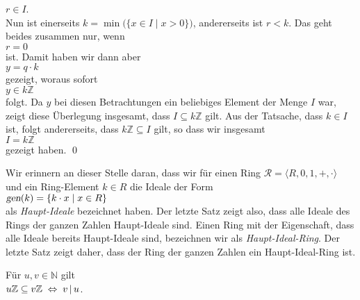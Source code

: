 \begin{enumerate}
      $r \in I$.
      \\[0.2cm]
      Nun ist einerseits $k = \min\bigl(\{x \in I \mid x > 0 \}\bigr)$, andererseits ist $r < k$.
      Das geht beides zusammen nur, wenn
      \\[0.2cm]
      \hspace*{1.3cm}
      $r = 0$
      \\[0.2cm]
      ist.  Damit haben wir dann aber
      \\[0.2cm]
      \hspace*{1.3cm}
      $y = q \cdot k$
      \\[0.2cm]
      gezeigt, woraus sofort
      \\[0.2cm]
      \hspace*{1.3cm}
      $y \in k\mathbb{Z}$
      \\[0.2cm]
      folgt.  Da $y$ bei diesen Betrachtungen ein beliebiges Element der Menge $I$ war,
      zeigt diese \"{U}berlegung insgesamt, dass $I \subseteq k\mathbb{Z}$ gilt.  Aus der
      Tatsache, dass $k \in I$ ist, folgt andererseits, dass $k\mathbb{Z} \subseteq I$
      gilt, so dass wir insgesamt
      \\[0.2cm]
      \hspace*{1.3cm}
      $I = k\mathbb{Z}$
      \\[0.2cm]
      gezeigt haben.  \qed
\end{enumerate}

\remark
Wir erinnern an dieser Stelle daran, dass wir f\"{u}r einen Ring 
$\mathcal{R} = \langle R, 0, 1, +, \cdot \rangle$ und ein
Ring-Element $k \in R$ die Ideale der Form
\\[0.2cm]
\hspace*{1.3cm}
$\textsl{gen}(k) = \{ k \cdot x \mid x \in R \}$
\\[0.2cm]
als \emph{Haupt-Ideale} bezeichnet haben.  Der letzte Satz zeigt also, dass alle Ideale des Rings
der ganzen Zahlen Haupt-Ideale sind.  Einen Ring mit der Eigenschaft, dass alle Ideale
bereits Haupt-Ideale sind, bezeichnen wir als {\emph{\color{blue}Haupt-Ideal-Ring}}.  Der letzte Satz
zeigt daher, dass der Ring der ganzen Zahlen ein Haupt-Ideal-Ring ist. \eoxs

\begin{Lemma}
  F\"{u}r $u,v \in \mathbb{N}$ gilt
  \\[0.2cm]
  \hspace*{1.3cm}
  $u\mathbb{Z} \subseteq v\mathbb{Z} \;\Leftrightarrow\; v \,|\, u$.
\end{Lemma}

